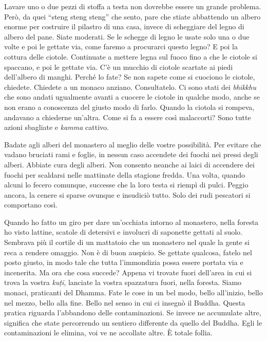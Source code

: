 Lavare uno o due pezzi di stoffa a testa non dovrebbe essere un grande
problema. Però, da quei ``steng steng steng'' che sento, pare che stiate
abbattendo un albero enorme per costruire il pilastro di una casa,
invece di scheggiare del legno di albero del pane. Siate moderati. Se le
schegge di legno le usate solo una o due volte e poi le gettate via,
come faremo a procurarci questo legno? E poi la cottura delle ciotole.
Continuate a mettere legna sul fuoco fino a che le ciotole si spaccano,
e poi le gettate via. C'è un mucchio di ciotole scartate ai piedi
dell'albero di manghi. Perché lo fate? Se non sapete come si cuociono le
ciotole, chiedete. Chiedete a un monaco anziano. Consultatelo. Ci sono
stati dei \emph{bhikkhu} che sono andati ugualmente avanti a cuocere le
ciotole in qualche modo, anche se non erano a conoscenza del giusto modo
di farlo. Quando la ciotola si rompeva, andavano a chiederne un'altra.
Come si fa a essere così malaccorti? Sono tutte azioni sbagliate e
\emph{kamma} cattivo.

Badate agli alberi del monastero al meglio delle vostre possibilità. Per
evitare che vadano bruciati rami e foglie, in nessun caso accendete dei
fuochi nei pressi degli alberi. Abbiate cura degli alberi. Non consento
neanche ai laici di accendere dei fuochi per scaldarsi nelle mattinate
della stagione fredda. Una volta, quando alcuni lo fecero comunque,
successe che la loro testa si riempì di pulci. Peggio ancora, la cenere
si sparse ovunque e insudiciò tutto. Solo dei rudi pescatori si
comportano così.

Quando ho fatto un giro per dare un'occhiata intorno al monastero, nella
foresta ho visto lattine, scatole di detersivi e involucri di saponette
gettati al suolo. Sembrava più il cortile di un mattatoio che un
monastero nel quale la gente si reca a rendere omaggio. Non è di buon
auspicio. Se gettate qualcosa, fatelo nel posto giusto, in modo tale che
tutta l'immondizia possa essere portata via e incenerita. Ma ora che
cosa succede? Appena vi trovate fuori dell'area in cui si trova la
vostra \emph{kuṭī}, lanciate la vostra spazzatura fuori, nella foresta.
Siamo monaci, praticanti del Dhamma. Fate le cose in un bel modo, bello
all'inizio, bello nel mezzo, bello alla fine. Bello nel senso in cui ci
insegnò il Buddha. Questa pratica riguarda l'abbandono delle
contaminazioni. Se invece ne accumulate altre, significa che state
percorrendo un sentiero differente da quello del Buddha. Egli le
contaminazioni le elimina, voi ve ne accollate altre. È totale follia.

